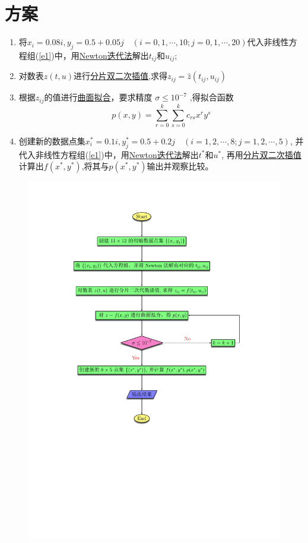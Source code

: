 \section{方案}
\begin{enumerate}
\item 将${x_i} = 0.08i,{y_j} = 0.5 + 0.05j\quad (i=0,1,\cdots,10;j=0,1,\cdots,20)$代入非线性方程组(\ref{e1})中，用\hyperref[sec:Newton]{Newton迭代法}解出$t_{ij}$和$u_{ij}$;

\item 对数表$z(t,u)$进行\hyperref[sec:Interpolation]{分片双二次插值},求得$z_{ij}=\hat{z}(t_{ij},u_{ij})$

\item 根据$z_{ij}$的值进行\hyperref[sec:qmnh]{曲面拟合}，要求精度
$\sigma \le 10^{-7}$
,得拟合函数
\[p(x,y) = \sum_{r = 0}^k\sum_{s = 0}^k {{c_{rs}}{x^r}{y^s}} \]

\item 
创建新的数据点集$x_i^{\ast}=0.1i,y_j^{\ast}=0.5+0.2j\quad (i = 1, 2,\cdots,8;j = 1,2,\cdots,5)$,
并代入非线性方程组(\ref{e1})中，用\hyperref[sec:Newton]{Newton迭代法}解出$t^{\ast}$和$u^{\ast}$,
再用\hyperref[sec:Interpolation]{分片双二次插值}计算出$f(x^{\ast},y^{\ast})$,将其与$p(x^{\ast},y^{\ast})$输出并观察比较。
\end{enumerate}

\newpage
\begin{figure}[h]
\small
\centering
\includegraphics[width=18cm]{flow1}
\end{figure}

